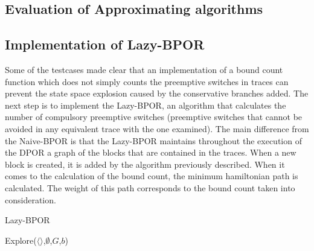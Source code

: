 \subsection{Evaluation of Approximating algorithms}




\subsection{Implementation of Lazy-BPOR}

Some of the testcases made clear that an implementation of a bound count function which does not simply counts the preemptive switches in traces can prevent
the state space explosion caused by the conservative branches added. The next step is to implement the Lazy-BPOR, an algorithm that calculates the number of compulsory
preemptive switches (preemptive switches that cannot be avoided in any equivalent trace with the one examined). The main difference from the Naive-BPOR is that
the Lazy-BPOR maintains throughout the execution of the DPOR a graph of the blocks that are contained in the traces. When a new block is created, it is added by the
algorithm previously described. When it comes to the calculation of the bound count, the minimum hamiltonian path is calculated. The weight of this path corresponds
to the bound count taken into consideration.

\begin{algorithm}
    \caption{Lazy-BPOR}
    \label{Lazy-BPOR}
    Explore($\langle \rangle$,$\emptyset$,$G$,$b$)\;
\end{algorithm}


